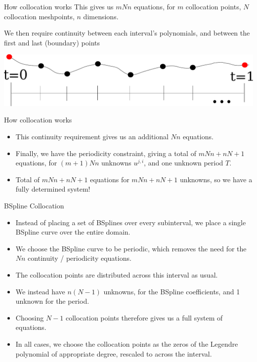 \documentclass[presentation]{beamer}
\begin{document}
\begin{frame}[label={sec:org3a6688d},plain]{How collocation works}
This gives us \(mNn\) equations, for \(m\) collocation points, \(N\) collocation meshpoints, \(n\) dimensions.

We then require continuity between each interval's polynomials, and between the first and last (boundary) points
\begin{center}
\includegraphics[width=.9\linewidth]{./8_continuity.pdf}
\end{center}
\end{frame}

\begin{frame}[label={sec:org411acd1},plain]{How collocation works}
\begin{itemize}
\item This continuity requirement gives us an additional \(Nn\) equations.
\item Finally, we have the periodicity constraint, giving a total of \(mNn + nN + 1\) equations, for \((m+1)Nn\) unknowns \(u^{j,i}\), and one unknown period \(T\).
\item Total of \(mNn + nN + 1\) equations for \(mNn + nN + 1\) unknowns, so we have a fully determined system!
\end{itemize}
\end{frame}

\begin{frame}[label={sec:org7ad56af},plain]{BSpline Collocation}
\begin{itemize}
\item Instead of placing a set of BSplines over every subinterval, we place a single BSpline curve over the entire domain.
\item We choose the BSpline curve to be periodic, which removes the need for the \(Nn\) continuity / periodicity equations.
\item The collocation points are distributed across this interval as usual.
\item We instead have \(n(N-1)\) unknowns, for the BSpline coefficients, and 1 unknown for the period.
\item Choosing \(N-1\) collocation points therefore gives us a full system of equations.
\item In all cases, we choose the collocation points as the zeros of the Legendre polynomial of appropriate degree, rescaled to across the interval.
\end{itemize}
\end{frame}
\end{document}
